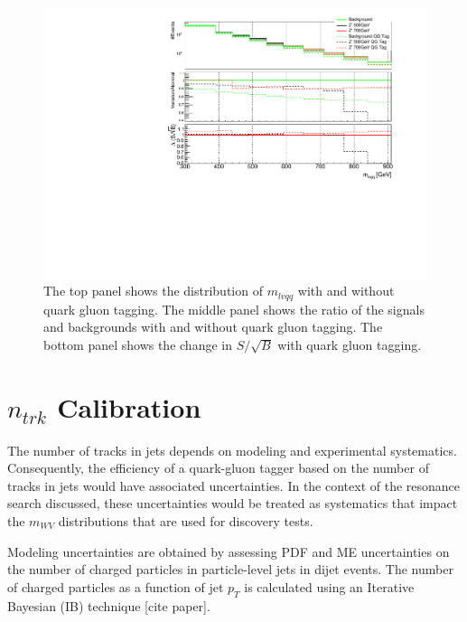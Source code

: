 \begin{figure}[h!]
  \centering
  \includegraphics[width=\hsize]{figures/QGT/s_root_b_recotag.pdf}
  \caption{The top panel shows the distribution of $m_{lvqq}$ with and without quark gluon tagging. The middle panel shows the ratio of the signals and backgrounds with and without quark gluon tagging. The bottom panel shows the change in $S/\sqrt{B}$ with quark gluon tagging.}
  \label{fig:qg_s_root_b}
\end{figure}
\FloatBarrier


\pagebreak
\pagebreak
\pagebreak
\chapter{$n_{trk}$ Calibration}
The number of tracks in jets depends on modeling and experimental systematics. Consequently, the efficiency of a quark-gluon tagger based on the number of tracks in jets would have associated uncertainties. In the context of the resonance search discussed, these uncertainties would be treated as systematics that impact the $m_{WV}$ distributions that are used for discovery tests.

Modeling uncertainties are obtained by assessing PDF and ME uncertainties on the number of charged particles in particle-level jets in dijet events. The number of charged particles as a function of jet $p_{T}$  is calculated using an Iterative Bayesian (IB) technique [cite paper].

